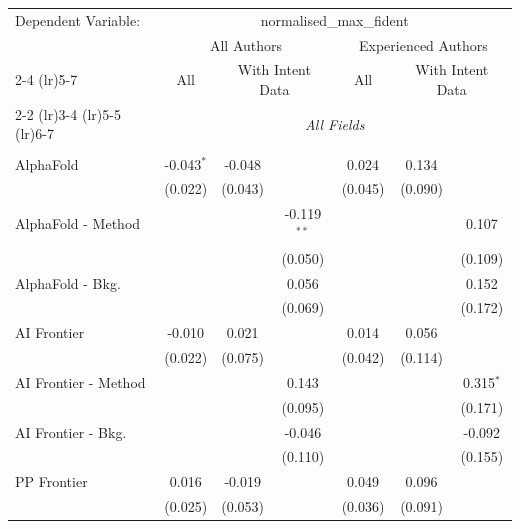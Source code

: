 \begingroup
\centering
\begin{tabular}{lcccccc}
   \tabularnewline \midrule \midrule
   Dependent Variable: & \multicolumn{6}{c}{normalised\_max\_fident}\\
 & \multicolumn{3}{c}{All Authors} & \multicolumn{3}{c}{Experienced Authors} \\
\cmidrule(lr){2-4} \cmidrule(lr){5-7}
 & \multicolumn{1}{c}{All} & \multicolumn{2}{c}{With Intent Data} & \multicolumn{1}{c}{All} & \multicolumn{2}{c}{With Intent Data} \\
\cmidrule(lr){2-2} \cmidrule(lr){3-4} \cmidrule(lr){5-5} \cmidrule(lr){6-7}
 & \multicolumn{6}{c}{\textit{All Fields}} \\ \\
   AlphaFold            & -0.043$^{*}$ & -0.048  &               & 0.024   & 0.134   &   \\   
                        & (0.022)      & (0.043) &               & (0.045) & (0.090) &   \\   
   AlphaFold - Method   &              &         & -0.119$^{**}$ &         &         & 0.107\\   
                        &              &         & (0.050)       &         &         & (0.109)\\   
   AlphaFold - Bkg.     &              &         & 0.056         &         &         & 0.152\\   
                        &              &         & (0.069)       &         &         & (0.172)\\   
   AI Frontier          & -0.010       & 0.021   &               & 0.014   & 0.056   &   \\   
                        & (0.022)      & (0.075) &               & (0.042) & (0.114) &   \\   
   AI Frontier - Method &              &         & 0.143         &         &         & 0.315$^{*}$\\   
                        &              &         & (0.095)       &         &         & (0.171)\\   
   AI Frontier - Bkg.   &              &         & -0.046        &         &         & -0.092\\   
                        &              &         & (0.110)       &         &         & (0.155)\\   
   PP Frontier          & 0.016        & -0.019  &               & 0.049   & 0.096   &   \\   
                        & (0.025)      & (0.053) &               & (0.036) & (0.091) &   \\   

\end{tabular}
